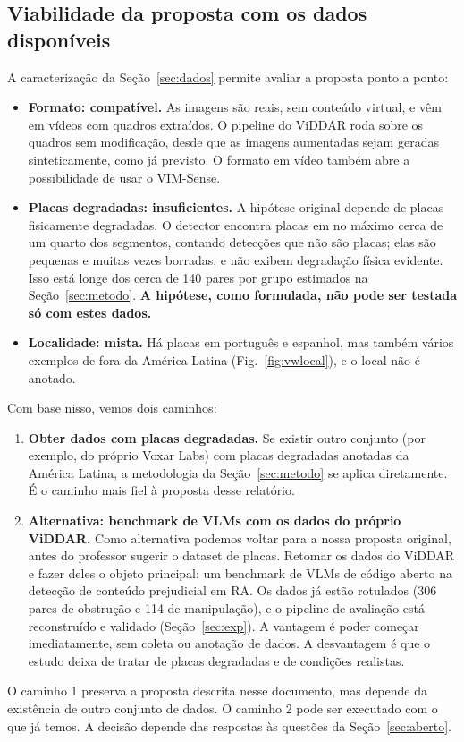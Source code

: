 \documentclass[journal,onecolumn]{IEEEtran}
\begin{document}
\subsection{Viabilidade da proposta com os dados disponíveis}
\label{sec:viabilidade}
A caracterização da Seção~\ref{sec:dados} permite avaliar a proposta ponto a ponto:
\begin{itemize}
\item \textbf{Formato: compatível.} As imagens são reais, sem conteúdo virtual, e vêm em vídeos com
  quadros extraídos. O pipeline do ViDDAR roda sobre os quadros sem modificação, desde que as imagens
  aumentadas sejam geradas sinteticamente, como já previsto. O formato em vídeo também abre a
  possibilidade de usar o VIM-Sense.
\item \textbf{Placas degradadas: insuficientes.} A hipótese original depende de placas fisicamente
  degradadas. O detector encontra placas em no máximo cerca de um quarto dos segmentos, contando
  detecções que não são placas; elas são pequenas e muitas vezes borradas, e não exibem degradação
  física evidente. Isso está longe dos cerca de 140 pares por grupo estimados na
  Seção~\ref{sec:metodo}. \textbf{A hipótese, como formulada, não pode ser testada só com estes dados.}
\item \textbf{Localidade: mista.} Há placas em português e espanhol, mas também vários exemplos de
  fora da América Latina (Fig.~\ref{fig:vwlocal}), e o local não é anotado.
\end{itemize}
Com base nisso, vemos dois caminhos:
\begin{enumerate}
\item \textbf{Obter dados com placas degradadas.} Se existir outro conjunto (por exemplo, do próprio
  Voxar Labs) com placas degradadas anotadas da América Latina, a metodologia da Seção~\ref{sec:metodo} se aplica
  diretamente. É o caminho mais fiel à proposta desse relatório.
\item \textbf{Alternativa: benchmark de VLMs com os dados do próprio ViDDAR.} Como alternativa
podemos voltar para a nossa proposta original, antes do professor sugerir o dataset de placas. Retomar os dados do
  ViDDAR e fazer deles o objeto principal: um
  benchmark de VLMs de código aberto na detecção de conteúdo prejudicial em RA. Os dados já estão rotulados 
  (306 pares de obstrução e 114 de manipulação), e o pipeline de
  avaliação está reconstruído e validado (Seção~\ref{sec:exp}).
  A vantagem é poder começar imediatamente, sem coleta ou anotação de dados. A desvantagem é que o
  estudo deixa de tratar de placas degradadas e de condições realistas.
\end{enumerate}
O caminho 1 preserva a proposta descrita nesse documento, mas depende da existência de outro conjunto de dados. O
caminho 2 pode ser executado com o que já temos. A decisão depende das respostas às questões da
Seção~\ref{sec:aberto}.
\end{document}
